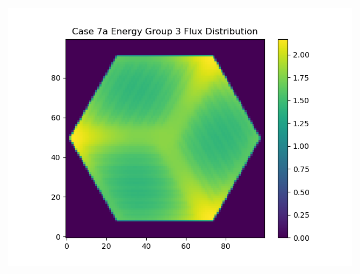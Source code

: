 \documentclass[letterpaper,11pt]{report}
\begin{document}
\begin{figure}[H]
\begin{subfigure}{.33\textwidth}
              \includegraphics[width=1.1\linewidth]{../../phase1a/case7a/analysis_output/p1a_7a_e_eg3.png}
              \caption{}
            \end{subfigure}
          \caption{}
          \label{fig:test}
          \end{figure}
\end{document}
